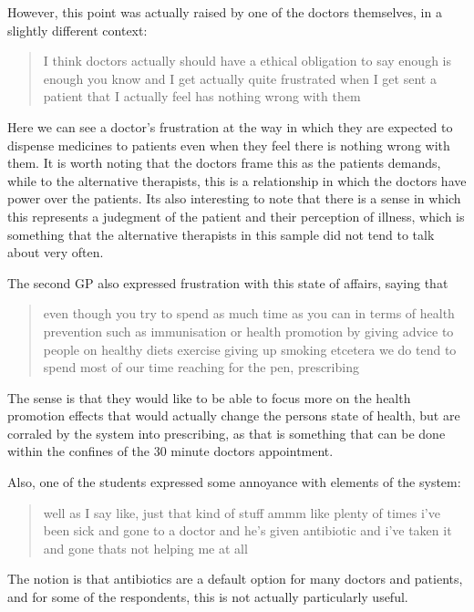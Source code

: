 However, this point was actually raised by one of the doctors themselves, in a slightly different context: 

\begin{quotation}
  I think doctors actually should have a ethical obligation to say enough is enough you know and I get actually quite frustrated when I get sent a patient that I actually feel has nothing wrong with them 

\end{quotation}

Here we can see a doctor's frustration at the way in which they are expected to dispense medicines to patients even when they feel there is nothing wrong with them. It is worth noting that the doctors frame this as the patients demands, while to the alternative therapists, this is a relationship in which the doctors have power over the patients. Its also interesting to note that there is  a sense in which this represents a judegment of the patient and their perception of illness, which is something that the alternative therapists in this sample did not tend to talk about very often. 

The second GP also expressed frustration with this state of affairs, saying that 
\begin{quotation}
  even though you try to spend as much time as you can in terms of health prevention such as immunisation or health promotion by giving advice to people on healthy diets exercise giving up smoking etcetera we do tend to spend most of our time reaching for the pen, prescribing 

\end{quotation}

The sense is that they would like to be able to focus more on the health promotion effects that would actually change the persons state of health, but are corraled by the system into prescribing, as that is something that can be done within the confines of the 30 minute doctors appointment. 

Also, one of the students expressed some annoyance with elements of the system: 
\begin{quotation}
  well as I say like, just that kind of stuff ammm like plenty of times i've been sick and gone to a doctor and he's given antibiotic and i've taken it and gone thats not helping me at all 

\end{quotation}

The notion is that antibiotics are a default option for many doctors and patients, and for some of the respondents, this is not actually particularly useful. 

